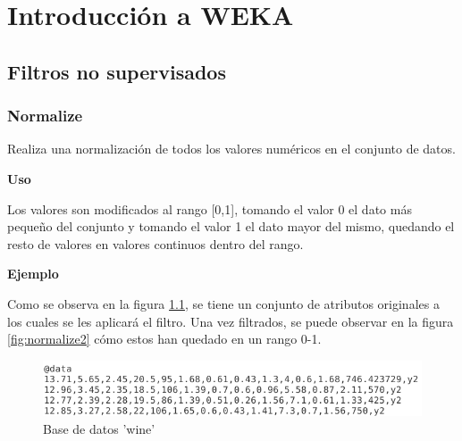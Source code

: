 \chapter{Introducción a WEKA}



\newpage
\section{Filtros no supervisados}
	

	\subsection{Normalize}

	\begin{justify}
	Realiza una normalización de todos los valores numéricos en el conjunto de datos. 
	\end{justify}

	\begin{justify}
	\textbf{Uso}

	Los valores son modificados al rango [0,1], tomando el valor 0 el dato más pequeño del conjunto y tomando el valor 1 el dato mayor del mismo, quedando el resto de valores en valores continuos dentro del rango.
	\end{justify}
	
	\begin{justify}

	\textbf{Ejemplo}

	Como se observa en la figura \ref{fig:normalize1}, se tiene un conjunto de atributos originales a los cuales se les aplicará el filtro. Una vez filtrados, se puede observar en la figura \ref{fig:normalize2} cómo estos han quedado en un rango 0-1.
	\end{justify}

	\begin{figure}[!htp]
	\centering
	\includegraphics[scale=.32]{./figuras/image22.png}
	\caption{Base de datos 'wine'}
	\label{fig:normalize1}
	\end{figure}
	
